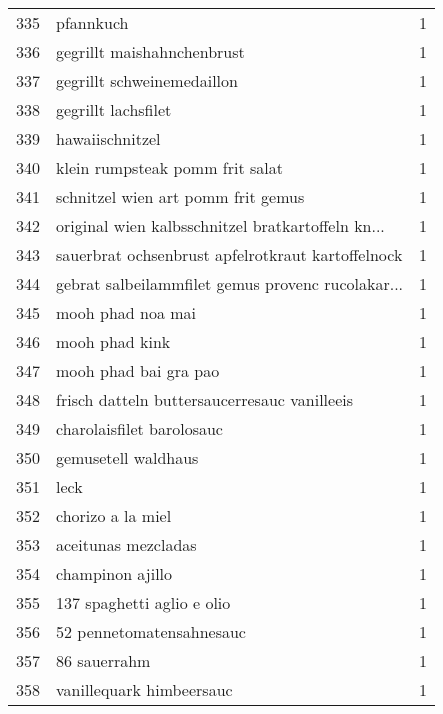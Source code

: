 \begin{tabular}{llr}
335 &                                          pfannkuch &      1 \\
336 &                         gegrillt maishahnchenbrust &      1 \\
337 &                         gegrillt schweinemedaillon &      1 \\
338 &                                gegrillt lachsfilet &      1 \\
339 &                                    hawaiischnitzel &      1 \\
340 &                    klein rumpsteak pomm frit salat &      1 \\
341 &                 schnitzel wien art pomm frit gemus &      1 \\
342 &  original wien kalbsschnitzel bratkartoffeln kn... &      1 \\
343 &  sauerbrat ochsenbrust apfelrotkraut kartoffelnock &      1 \\
344 &  gebrat salbeilammfilet gemus provenc rucolakar... &      1 \\
345 &                                  mooh phad noa mai &      1 \\
346 &                                     mooh phad kink &      1 \\
347 &                              mooh phad bai gra pao &      1 \\
348 &       frisch datteln buttersaucerresauc vanilleeis &      1 \\
349 &                          charolaisfilet barolosauc &      1 \\
350 &                                gemusetell waldhaus &      1 \\
351 &                                               leck &      1 \\
352 &                                  chorizo a la miel &      1 \\
353 &                                aceitunas mezcladas &      1 \\
354 &                                   champinon ajillo &      1 \\
355 &                         137 spaghetti aglio e olio &      1 \\
356 &                           52 pennetomatensahnesauc &      1 \\
357 &                                       86 sauerrahm &      1 \\
358 &                           vanillequark himbeersauc &      1 \\

\end{tabular}
